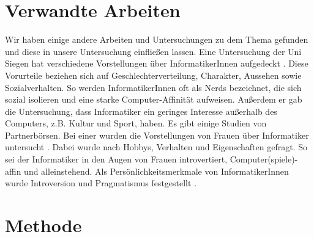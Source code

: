 \documentclass[de]{agse-empir-report}\usepackage[]{graphicx}\usepackage[]{color}
\begin{document}
\section[at]{Verwandte Arbeiten}
Wir haben einige andere Arbeiten und Untersuchungen zu dem Thema gefunden und diese in unsere Untersuchung einfließen lassen. Eine Untersuchung der Uni Siegen hat verschiedene Vorstellungen über InformatikerInnen aufgedeckt \cite{Weber09}. Diese Vorurteile beziehen sich auf Geschlechterverteilung, Charakter, Aussehen sowie Sozialverhalten. So werden InformatikerInnen oft als Nerds bezeichnet, die sich sozial isolieren und eine starke Computer-Affinität aufweisen. Außerdem er gab die Untersuchung, dass Informatiker ein geringes Interesse außerhalb des Computers, z.B. Kultur und Sport, haben. 
Es gibt einige Studien von Partnerbörsen. Bei einer wurden die Vorstellungen von Frauen über Informatiker untersucht \cite{partnersuche.de}. Dabei wurde nach Hobbys, Verhalten und Eigenschaften gefragt. So sei der Informatiker in den Augen von Frauen introvertiert, Computer(spiele)-affin und alleinstehend. Als Persönlichkeitsmerkmale von InformatikerInnen wurde Introversion und Pragmatismus festgestellt \cite{parship}.


\section[jk]{Methode}
\end{document}
